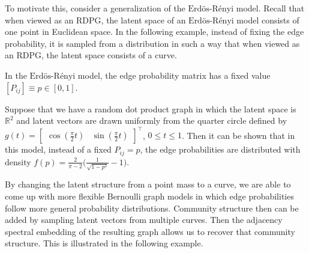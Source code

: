 \documentclass[12pt]{article}
\begin{document}
To motivate this, consider a generalization of the
\(\text{Erd\"{o}s-R\'{e}nyi}\) model. Recall that when viewed as an
RDPG, the latent space of an \(\text{Erd\"{o}s-R\'{e}nyi}\) model
consists of one point in Euclidean space. In the following example,
instead of fixing the edge probability, it is sampled from a
distribution in such a way that when viewed as an RDPG, the latent space
consists of a curve.

\begin{example}
In the $\text{Erd\"{o}s-R\'{e}nyi}$ model, the edge probability matrix has a fixed value $[P_{ij}] \equiv p \in [0, 1]$. 

Suppose that we have a random dot product graph in which the latent space is $\mathbb{R}^2$ and latent vectors are drawn uniformly from the quarter circle defined by $g(t) = \begin{bmatrix} \cos(\frac{\pi}{2} t) & \sin(\frac{\pi}{2} t) \end{bmatrix}^\top$, $0 \leq t \leq 1$. 
Then it can be shown that in this model, instead of a fixed $P_{ij} = p$, the edge probabilities are distributed with density $f(p) = \frac{2}{\pi - 2} \Big(\frac{1}{\sqrt{1 - p^2}} - 1 \Big)$. 
\end{example}

By changing the latent structure from a point mass to a curve, we are
able to come up with more flexible Bernoulli graph models in which edge
probabilities follow more general probability distributions. Community
structure then can be added by sampling latent vectors from multiple
curves. Then the adjacency spectral embedding of the resulting graph
allows us to recover that community structure. This is illustrated in
the following example.
\end{document}
